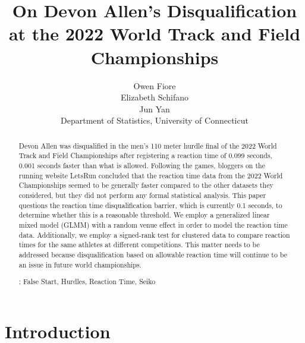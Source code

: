 \documentclass[12pt, letterpaper, titlepage]{article}
\title{On Devon Allen's Disqualification at the 2022 World Track and Field 
Championships}
\author{Owen Fiore\\
  Elizabeth Schifano\\
  Jun Yan\\[1ex]
  Department of Statistics, University of Connecticut\\
}
\date{}
\begin{document}
\maketitle

\begin{abstract}
Devon Allen was disqualified in the men's 110 meter hurdle final of the 2022
World Track and Field Championships after registering a reaction time of 0.099 
seconds, 0.001 seconds faster than what is allowed. Following the games, 
bloggers on the running website LetsRun concluded that the reaction time data 
from the 2022 World Championships seemed to be generally faster compared to the 
other datasets they considered, but they did not perform any formal 
statistical analysis. This paper questions the reaction time 
disqualification barrier, which is currently 0.1 seconds, to determine whether 
this is a reasonable threshold. We employ a generalized linear mixed model 
(GLMM) with a random venue effect in order to  model the reaction time data. 
Additionally, we employ a signed-rank test for clustered data to 
compare reaction times for the same athletes at different competitions. This 
matter needs to be addressed because disqualification based on allowable 
reaction time will continue to be an issue in future world championships.




\bigskip{}:
False Start, Hurdles, Reaction Time, Seiko 

\end{abstract}

\doublespace


\section{Introduction}
\label{sec:intro}
\end{document}
